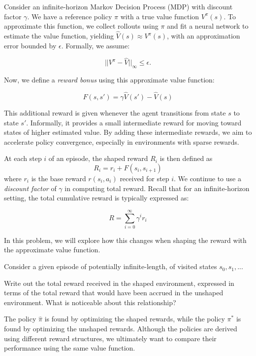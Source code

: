 \documentclass[11pt]{article}
\begin{document}
\noindent Consider an infinite-horizon Markov Decision Process (MDP) with discount factor $\gamma$. We have a reference policy $\pi$ with a true value function $V^\pi(s)$. To approximate this function, we collect rollouts using $\pi$ and fit a neural network to estimate the value function, yielding $\hat V(s) \approx V^\pi(s)$, with an approximation error bounded by $\epsilon$. Formally, we assume:

$$ || V^\pi - \hat V||_{\infty} \leq \epsilon. $$

\noindent Now, we define a \emph{reward bonus} using this approximate value function:

$$F(s,s') = \gamma \hat V(s') - \hat V(s)$$

\noindent This additional reward is given whenever the agent transitions from state $s$ to state $s'$. 
Informally, it provides a small intermediate reward for moving toward states of higher estimated value. By adding these intermediate rewards, we aim to accelerate policy convergence, especially in environments with sparse rewards.

\noindent At each step $i$ of an episode, the shaped reward $R_i$ is then defined as
$$R_i = r_i + F(s_i,s_{i+1})$$
where $r_i$ is the base reward $r(s_i, a_i)$ received for step $i$. We continue to use a \emph{discount factor} of $\gamma$ in computing total reward. Recall that for an infinite-horizon setting, the total cumulative reward is typically expressed as:

$$R = \sum_{i = 0}^{\infty} \gamma^i r_i$$

\noindent In this problem, we will explore how this changes when shaping the reward with the approximate value function.
\newline


 \noindent Consider a given episode of potentially infinite-length, of visited states $s_0, s_1,...$ 

\noindent Write out the total reward received in the shaped environment, expressed in terms of the total reward that would have been accrued in the unshaped environment. What is noticeable about this relationship? 
\newline

 The policy $\hat \pi$ is found by optimizing the shaped rewards, while the policy $\pi^*$ is found by optimizing the unshaped rewards. Although the policies are derived using different reward structures, we ultimately want to compare their performance using the same value function.
\newline
\end{document}
